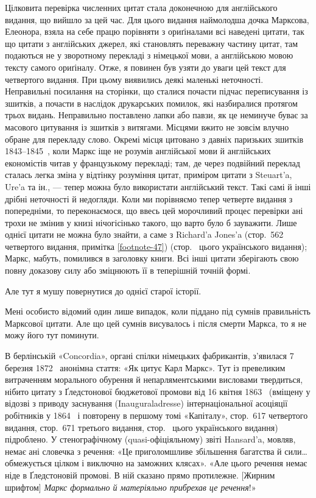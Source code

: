 Цілковита перевірка численних цитат стала доконечною для
англійського видання, що вийшло за цей час. Для цього видання
наймолодша дочка Марксова, Елеонора, взяла на себе працю
порівняти з ориґіналами всі наведені цитати, так що цитати
з англійських джерел, які становлять переважну частину цитат,
там подаються не у зворотному перекладі з німецької мови, а
англійською мовою тексту самого ориґіналу. Отже, я повинен був
узяти до уваги цей текст для четвертого видання. При цьому виявились
деякі маленькі неточності. Неправильні посилання на сторінки,
що сталися почасти підчас переписування із зшитків, а почасти
в наслідок друкарських помилок, які назбиралися протягом
трьох видань. Неправильно поставлено лапки або павзи, як це
неминуче буває за масового цитування із зшитків з витягами.
Місцями вжито не зовсім влучно обране для перекладу слово.
Окремі місця цитовано з давніх паризьких зшитків 1843--1845~,
коли Маркс іще не розумів англійської мови й англійських економістів
читав у французькому перекладі; там, де через подвійний
переклад сталась легка зміна у відтінку розуміння цитат, приміром
цитати з Steuart’a, Ure’a та ін., — тепер можна було використати
англійський текст. Такі самі й інші дрібні неточності й недогляди.
Коли ми порівняємо тепер четверте видання з попередніми, то
переконаємося, що ввесь цей морочливий процес перевірки ані
трохи не змінив у книзі нічогісінько такого, що варто було б
зауважити. Лише однієї цитати не можна було знайти, а саме
з Richard’a Jones’a (стор.~562 четвертого видання, примітка \ref{footnote-47})
(стор.~\pageref{footnote-47} цього українського видання); Маркс, мабуть, помилився
в заголовку книги. Всі інші цитати зберігають свою повну
доказову силу або зміцнюють її в теперішній точній формі.

Але тут я мушу повернутися до однієї старої історії.

Мені особисто відомий один лише випадок, коли піддано під
сумнів правильність Марксової цитати. Але що цей сумнів висувалось
і після смерти Маркса, то я не можу його тут поминути.

В берлінській «Concordia», органі спілки німецьких фабрикантів,
з’явилася 7 березня 1872~ анонімна стаття: «Як цитує
Карл Маркс». Тут із превеликим витраченням морального обурення
й непарляментськими висловами твердиться, нібито цитату
з Ґледстонової бюджетової промови від 16 квітня 1863~
(вміщену у відозві з приводу заснування (Inauguraladresse) інтернаціональної
асоціяції робітників у 1864~ і повторену в першому
томі «Капіталу», стор.~617 четвертого видання, стор.~671 третього
видання, стор.~\pageref{footnote-105} цього українського видання) підроблено.
У стенографічному (quasi-офіціяльному) звіті Hansard’a,
мовляв, немає ані словечка з речення: «Це приголомшливе збільшення
багатства й сили\dots{} обмежується цілком і виключно на
заможних клясах». «Але цього речення немає ніде в Ґледстоновій
промові. В ній сказано прямо протилежне. [Жирним
шрифтом] \emph{Маркс формально й матеріяльно прибрехав це речення}!»

